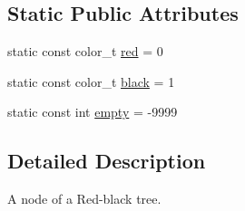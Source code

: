 \subsection*{Static Public Attributes}
\begin{DoxyCompactItemize}
\item 
static const color\+\_\+t \hyperlink{class_r_b_node_a717168defd1a144e4d3987a52baebce4}{red} = 0
\item 
static const color\+\_\+t \hyperlink{class_r_b_node_af06dfc3afd8618bf3c6c352c74ba10fc}{black} = 1
\item 
static const int \hyperlink{class_r_b_node_a139c48e69866041cc111cf161e739ec1}{empty} = -\/9999
\end{DoxyCompactItemize}


\subsection{Detailed Description}
A node of a Red-\/black tree. 

